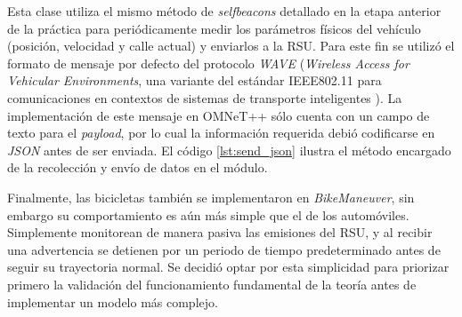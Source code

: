 \documentclass[11pt,letterpaper]{article}
\begin{document}
\begin{description}[leftmargin=!,labelwidth=\widthof{\bfseries Automóviles}]
	Esta clase utiliza el mismo método de \emph{selfbeacons} detallado en la etapa anterior de la práctica para periódicamente medir los parámetros físicos del vehículo (posición, velocidad y calle actual) y enviarlos a la RSU. Para este fin se utilizó el formato de mensaje por defecto del protocolo \emph{WAVE} (\emph{Wireless Access for Vehicular Environments}, una variante del estándar IEEE802.11 para comunicaciones en contextos de sistemas de transporte inteligentes \cite{80211wave}). La implementación de este mensaje en OMNeT++ sólo cuenta con un campo de texto para el \emph{payload}, por lo cual la información requerida debió codificarse en \emph{JSON} antes de ser enviada. El código \ref{lst:send_json} ilustra el método encargado de la recolección y envío de datos en el módulo.
	\item [Bicicletas]	Finalmente, las bicicletas también se implementaron en \emph{BikeManeuver}, sin embargo su comportamiento es aún más simple que el de los automóviles. Simplemente monitorean de manera pasiva las emisiones del RSU, y al recibir una advertencia se detienen por un periodo de tiempo predeterminado antes de seguir su trayectoria normal. Se decidió optar por esta simplicidad para priorizar primero la validación del funcionamiento fundamental de la teoría antes de implementar un modelo más complejo.
\end{description}
\end{document}

